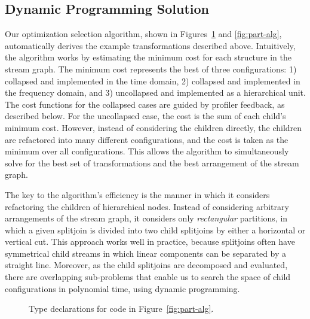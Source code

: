 \subsection{Dynamic Programming Solution}

Our optimization selection algorithm, shown in
Figures~\ref{fig:part-decl} and \ref{fig:part-alg}, automatically
derives the example transformations described above.  Intuitively, the
algorithm works by estimating the minimum cost for each structure in
the stream graph. The minimum cost represents the best of three
configurations: 1) collapsed and implemented in the time domain, 2)
collapsed and implemented in the frequency domain, and 3) uncollapsed
and implemented as a hierarchical unit.  The cost functions for the
collapsed cases are guided by profiler feedback, as described below.
For the uncollapsed case, the cost is the sum of each child's minimum
cost.  However, instead of considering the children directly, the
children are refactored into many different configurations, and the
cost is taken as the minimum over all configurations.  This allows the
algorithm to simultaneously solve for the best set of transformations
and the best arrangement of the stream graph.

The key to the algorithm's efficiency is the manner in which it
considers refactoring the children of hierarchical nodes.  Instead of
considering arbitrary arrangements of the stream graph, it considers
only {\it rectangular} partitions, in which a given splitjoin is
divided into two child splitjoins by either a horizontal 
or vertical cut.
This approach works well in practice, because splitjoins often have
symmetrical child streams in which linear components can be separated
by a straight line.  Moreover, as the child splitjoins are decomposed
and evaluated, there are overlapping sub-problems that enable us to
search the space of child configurations in polynomial time, using
dynamic programming.

\begin{figure}[t]
\vspace{-12pt}
  \vspace{-10pt}
  \caption{Type declarations for code in Figure~\ref{fig:part-alg}.
  \protect\label{fig:part-decl}}
  \vspace{-24pt}
  \makeline
  \vspace{-14pt}
\end{figure}

